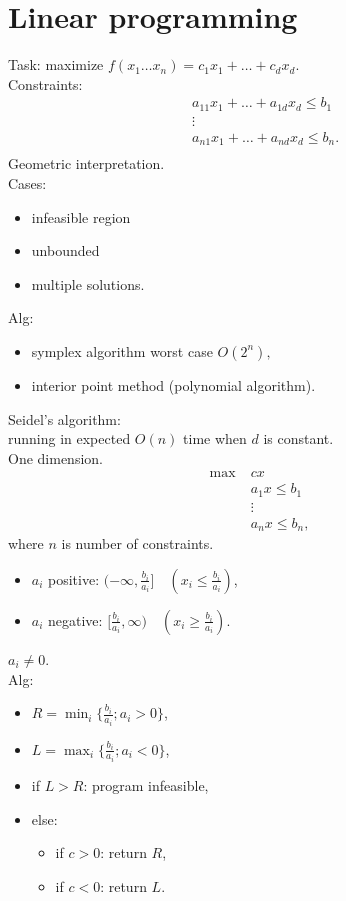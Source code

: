 \documentclass[a4paper, 12pt]{book}
\theoremstyle{definition}
\theoremstyle{remark}
\begin{document}
\section{Linear programming}

Task: maximize $f(x_1 \dots x_n) = c_1 x_1 + \dots + c_d x_d$. \\
Constraints:
\begin{align*}
  &a_{11} x_1 + \dots + a_{1d} x_d \leq b_1 \\
  &\vdots \\
  &a_{n1} x_1 + \dots + a_{nd} x_d \leq b_n. \\
\end{align*}
Geometric interpretation. \\
Cases:
\begin{itemize}
  \item infeasible region
  \item unbounded
  \item multiple solutions.
\end{itemize}
Alg:
\begin{itemize}
  \item symplex algorithm worst case $O\left(2^n\right),$
  \item interior point method (polynomial algorithm).
\end{itemize}
Seidel's algorithm: \\
running in expected $O(n)$ time when $d$ is constant. \\
One dimension.
\begin{align*}
  \max \; &c x \\
  &a_1 x \leq b_1 \\
  &\vdots \\
  &a_n x \leq b_n,
\end{align*}
where $n$ is number of constraints. \\
\begin{itemize}
  \item $a_i$ positive: $(-\infty, \frac{b_i}{a_i}] \quad \left(x_i \leq \frac{b_i}{a_i}\right)$,
  \item $a_i$ negative: $[\frac{b_i}{a_i}, \infty) \quad \left(x_i \geq \frac{b_i}{a_i}\right)$.
\end{itemize}
$a_i \neq 0$. \\
Alg:
\begin{itemize}[label={}]
  \item $R = \min_i \{\frac{b_i}{a_i}; a_i > 0\}$,
  \item $L = \max_i \{\frac{b_i}{a_i}; a_i < 0\}$,
  \item if $L > R$: program infeasible,
  \item else:
    \begin{itemize}[label={}]
      \item if $c > 0$: return $R$,
      \item if $c < 0$: return $L$.
    \end{itemize}
\end{itemize}
\end{document}
